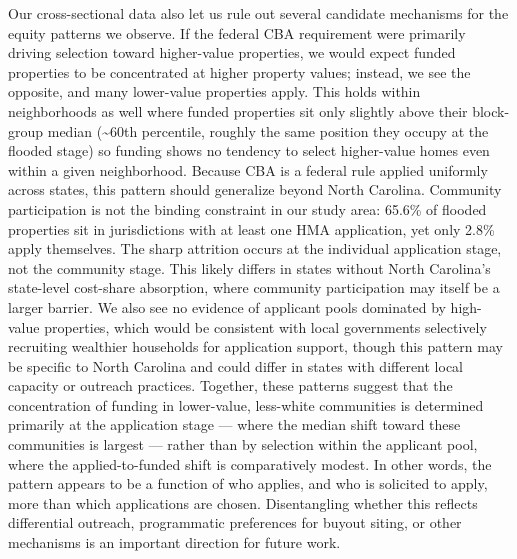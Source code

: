 \documentclass[
  authoryear,
  preprint]{elsarticle}
\begin{document}
Our cross-sectional data also let us rule out several candidate
mechanisms for the equity patterns we observe. If the federal CBA
requirement were primarily driving selection toward higher-value
properties, we would expect funded properties to be concentrated at
higher property values; instead, we see the opposite, and many
lower-value properties apply. This holds within neighborhoods as well
where funded properties sit only slightly above their block-group median
(\textasciitilde60th percentile, roughly the same position they occupy
at the flooded stage) so funding shows no tendency to select
higher-value homes even within a given neighborhood. Because CBA is a
federal rule applied uniformly across states, this pattern should
generalize beyond North Carolina. Community participation is not the
binding constraint in our study area: 65.6\% of flooded properties sit
in jurisdictions with at least one HMA application, yet only 2.8\% apply
themselves. The sharp attrition occurs at the individual application
stage, not the community stage. This likely differs in states without
North Carolina's state-level cost-share absorption, where community
participation may itself be a larger barrier. We also see no evidence of
applicant pools dominated by high-value properties, which would be
consistent with local governments selectively recruiting wealthier
households for application support, though this pattern may be specific
to North Carolina and could differ in states with different local
capacity or outreach practices. Together, these patterns suggest that
the concentration of funding in lower-value, less-white communities is
determined primarily at the application stage --- where the median shift
toward these communities is largest --- rather than by selection within
the applicant pool, where the applied-to-funded shift is comparatively
modest. In other words, the pattern appears to be a function of who
applies, and who is solicited to apply, more than which applications are
chosen. Disentangling whether this reflects differential outreach,
programmatic preferences for buyout siting, or other mechanisms is an
important direction for future work.
\end{document}
